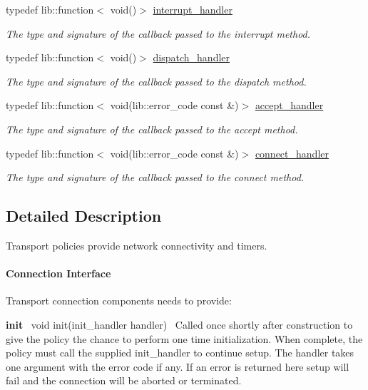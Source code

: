 \begin{DoxyCompactItemize}
typedef lib\+::function$<$ void()$>$ \hyperlink{namespacewebsocketpp_1_1transport_a8090563b066d7e8e31f7165be18dee51}{interrupt\+\_\+handler}
\begin{DoxyCompactList}\small\item\em The type and signature of the callback passed to the interrupt method. \end{DoxyCompactList}\item 
typedef lib\+::function$<$ void()$>$ \hyperlink{namespacewebsocketpp_1_1transport_a6658447b2e10f4c712dd792aad0e0c78}{dispatch\+\_\+handler}
\begin{DoxyCompactList}\small\item\em The type and signature of the callback passed to the dispatch method. \end{DoxyCompactList}\item 
typedef lib\+::function$<$ void(lib\+::error\+\_\+code const \&)$>$ \hyperlink{namespacewebsocketpp_1_1transport_a9326ea831379368ee47841b2e46cb009}{accept\+\_\+handler}
\begin{DoxyCompactList}\small\item\em The type and signature of the callback passed to the accept method. \end{DoxyCompactList}\item 
typedef lib\+::function$<$ void(lib\+::error\+\_\+code const \&)$>$ \hyperlink{namespacewebsocketpp_1_1transport_ac392fca34e946b48414278c0c3addfa5}{connect\+\_\+handler}
\begin{DoxyCompactList}\small\item\em The type and signature of the callback passed to the connect method. \end{DoxyCompactList}\end{DoxyCompactItemize}


\subsection{Detailed Description}
Transport policies provide network connectivity and timers. 

\paragraph*{Connection Interface}

Transport connection components needs to provide\+:

{\bfseries init}~\newline
{\ttfamily void init(init\+\_\+handler handler)}~\newline
Called once shortly after construction to give the policy the chance to perform one time initialization. When complete, the policy must call the supplied {\ttfamily init\+\_\+handler} to continue setup. The handler takes one argument with the error code if any. If an error is returned here setup will fail and the connection will be aborted or terminated.

